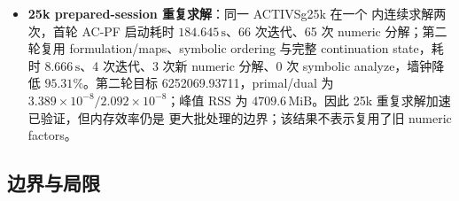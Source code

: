 \begin{itemize}
        65 次分解。该选项默认关闭，不能作为 25k 加速声明。
  \item \textbf{25k prepared-session 重复求解}：同一 ACTIVSg25k 在一个
         内连续求解两次，首轮 AC-PF 启动耗时
        $184.645\,\mathrm{s}$、66 次迭代、65 次 numeric 分解；第二轮复用
        formulation/maps、symbolic ordering 与完整 continuation state，耗时
        $8.666\,\mathrm{s}$、4 次迭代、3 次新 numeric 分解、0 次 symbolic
        analyze，墙钟降低 $95.31\%$。第二轮目标 6252069.93711，primal/dual
        为 $3.389\times10^{-8}/2.092\times10^{-8}$；峰值 RSS 为
        $4709.6\,\mathrm{MiB}$。因此 25k 重复求解加速已验证，但内存效率仍是
        更大批处理的边界；该结果不表示复用了旧 numeric factors。
\end{itemize}

\subsection{边界与局限}\label{subsec:acopfnative:limitations}

